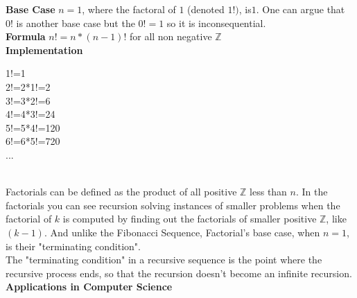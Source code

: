 \documentclass{article}
\begin{document}
{\bf Base Case} $n=1$, where the factoral of $1$ (denoted $1!)$, is$ 1$.
One can argue that $0!$ is another base case but the $0!=1$ so it is inconsequential. 
\\
{\bf Formula} $n! = n * (n-1)!$ for all non negative $\mathbb{Z}$ 
\\
{\bf Implementation} \\
\begin{center}
	1!=1
	\\
	2!=2*1!=2
	\\
	3!=3*2!=6
	\\
	4!=4*3!=24
	\\
	5!=5*4!=120
	\\
	6!=6*5!=720
	\\
	...

\end{center}
~\\
Factorials can be defined as the product of all positive $\mathbb{Z}$ less than $n$. In the factorials you can see recursion solving instances of smaller problems when the factorial of $k$ is computed by finding out the factorials of smaller positive $\mathbb{Z}$, like $(k-1)$. And unlike the Fibonacci Sequence, Factorial's base case, when $n=1$, is their "terminating condition".    \\
The "terminating condition" in a recursive sequence is the point where the recursive process ends, so that the recursion doesn't become an infinite recursion.  
{\bf Applications in Computer Science}
\\
\end{document}
